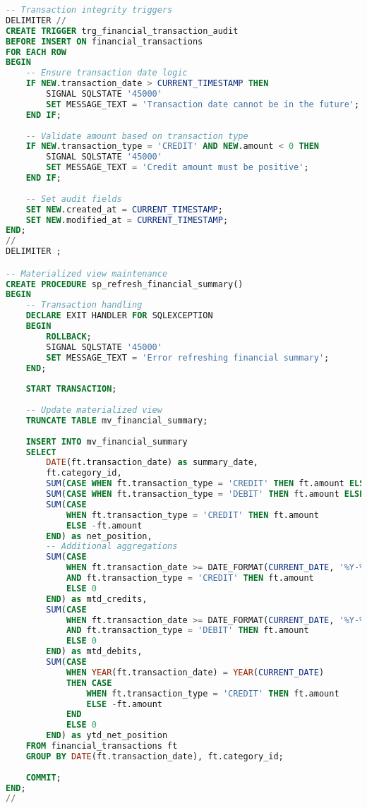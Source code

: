 \documentclass[conference]{IEEEtran}
\begin{document}
\begin{lstlisting}[language=SQL, caption=Data Integrity Implementation]
-- Transaction integrity triggers
DELIMITER //
CREATE TRIGGER trg_financial_transaction_audit
BEFORE INSERT ON financial_transactions
FOR EACH ROW
BEGIN
    -- Ensure transaction date logic
    IF NEW.transaction_date > CURRENT_TIMESTAMP THEN
        SIGNAL SQLSTATE '45000'
        SET MESSAGE_TEXT = 'Transaction date cannot be in the future';
    END IF;
    
    -- Validate amount based on transaction type
    IF NEW.transaction_type = 'CREDIT' AND NEW.amount < 0 THEN
        SIGNAL SQLSTATE '45000'
        SET MESSAGE_TEXT = 'Credit amount must be positive';
    END IF;
    
    -- Set audit fields
    SET NEW.created_at = CURRENT_TIMESTAMP;
    SET NEW.modified_at = CURRENT_TIMESTAMP;
END;
//
DELIMITER ;

-- Materialized view maintenance
CREATE PROCEDURE sp_refresh_financial_summary()
BEGIN
    -- Transaction handling
    DECLARE EXIT HANDLER FOR SQLEXCEPTION
    BEGIN
        ROLLBACK;
        SIGNAL SQLSTATE '45000'
        SET MESSAGE_TEXT = 'Error refreshing financial summary';
    END;
    
    START TRANSACTION;
    
    -- Update materialized view
    TRUNCATE TABLE mv_financial_summary;
    
    INSERT INTO mv_financial_summary
    SELECT 
        DATE(ft.transaction_date) as summary_date,
        ft.category_id,
        SUM(CASE WHEN ft.transaction_type = 'CREDIT' THEN ft.amount ELSE 0 END) as total_credits,
        SUM(CASE WHEN ft.transaction_type = 'DEBIT' THEN ft.amount ELSE 0 END) as total_debits,
        SUM(CASE 
            WHEN ft.transaction_type = 'CREDIT' THEN ft.amount 
            ELSE -ft.amount 
        END) as net_position,
        -- Additional aggregations
        SUM(CASE 
            WHEN ft.transaction_date >= DATE_FORMAT(CURRENT_DATE, '%Y-%m-01')
            AND ft.transaction_type = 'CREDIT' THEN ft.amount 
            ELSE 0 
        END) as mtd_credits,
        SUM(CASE 
            WHEN ft.transaction_date >= DATE_FORMAT(CURRENT_DATE, '%Y-%m-01')
            AND ft.transaction_type = 'DEBIT' THEN ft.amount 
            ELSE 0 
        END) as mtd_debits,
        SUM(CASE 
            WHEN YEAR(ft.transaction_date) = YEAR(CURRENT_DATE)
            THEN CASE 
                WHEN ft.transaction_type = 'CREDIT' THEN ft.amount 
                ELSE -ft.amount 
            END
            ELSE 0 
        END) as ytd_net_position
    FROM financial_transactions ft
    GROUP BY DATE(ft.transaction_date), ft.category_id;
    
    COMMIT;
END;
//
\end{lstlisting}
\end{document}
